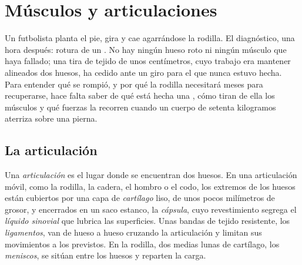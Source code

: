 \chapter{Músculos y articulaciones}\label{ch:g10:muscles-and-joints}

Un futbolista planta el pie, gira y cae agarrándose la rodilla. El
diagnóstico, una hora después: rotura de un . No hay ningún
hueso roto ni ningún músculo que haya fallado; una tira de tejido de
unos centímetros, cuyo trabajo era mantener alineados dos huesos, ha
cedido ante un giro para el que nunca estuvo hecha. Para entender qué
se rompió, y por qué la rodilla necesitará meses para recuperarse, hace
falta saber de qué está hecha una , cómo tiran de ella los
músculos y qué fuerzas la recorren cuando un cuerpo de setenta
kilogramos aterriza sobre una pierna.

\section{La articulación}

\begin{definition}[Articulación]\label{def:g10:muscles-and-joints:joint}
Una \emph{articulación} es el lugar donde se
encuentran dos huesos. En una articulación móvil, como la rodilla, la
cadera, el hombro o el codo, los extremos de los huesos están cubiertos
por una capa de \emph{cartílago} liso, de unos pocos
milímetros de grosor, y encerrados en un saco estanco, la
\emph{cápsula}, cuyo revestimiento segrega el \emph{líquido sinovial}
que lubrica las superficies. Unas bandas de tejido resistente, los
\emph{ligamentos}, van de hueso a hueso cruzando la
articulación y limitan sus movimientos a los previstos. En la rodilla,
dos medias lunas de cartílago, los \emph{meniscos}, se sitúan entre los
huesos y reparten la carga.
\end{definition}

